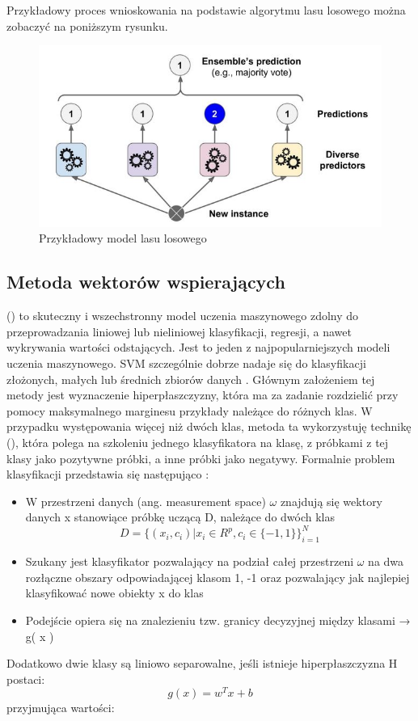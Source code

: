 Przykładowy proces wnioskowania na podstawie algorytmu lasu losowego można zobaczyć na poniższym rysunku.
\begin{figure}[h] 
        \centering\includegraphics[width=14cm]{figures/randomForestModel.JPG}
        \caption{Przykładowy model lasu losowego \cite{Geron}}
\end{figure}

\newpage

\subsection{Metoda wektorów wspierających}
\noindent
{} () to skuteczny i wszechstronny model uczenia maszynowego zdolny do przeprowadzania liniowej lub nieliniowej klasyfikacji, regresji, a nawet wykrywania wartości odstających. Jest to jeden z najpopularniejszych modeli uczenia maszynowego. SVM szczególnie dobrze nadaje się do klasyfikacji złożonych, małych lub średnich zbiorów danych \cite{Geron}. Głównym założeniem tej metody jest wyznaczenie hiperpłaszczyzny, która ma za zadanie rozdzielić przy pomocy maksymalnego marginesu przykłady należące do różnych klas. W przypadku występowania więcej niż dwóch klas, metoda ta wykorzystuję technikę  (), która polega na szkoleniu jednego klasyfikatora na klasę, z próbkami z tej klasy jako pozytywne próbki, a inne próbki jako negatywy. Formalnie problem klasyfikacji przedstawia się następująco \cite{Prezentacja:SVM2}: 
\begin{itemize}
    \item W przestrzeni danych (ang. measurement space) $\omega$ znajdują się wektory danych x stanowiące próbkę uczącą D, należące do dwóch klas\\
    \begin{equation}
D = \big\{(x_{i}, c_{i}) | x_{i} \in R^{p}, c_{i} \in \{-1, 1\}\big\}_{i=1}^{N}
    \end{equation}
    \item Szukany jest klasyfikator pozwalający na podział całej przestrzeni $\omega$ na dwa rozłączne obszary odpowiadającej klasom {1, -1} oraz pozwalający jak najlepiej klasyfikować nowe obiekty x do klas
    \item Podejście opiera się na znalezieniu tzw. granicy decyzyjnej między klasami → g( x )
\end{itemize}
Dodatkowo dwie klasy są liniowo separowalne, jeśli istnieje hiperpłaszczyzna H postaci: \[g(x) = w^Tx + b\] przyjmująca wartości: 

